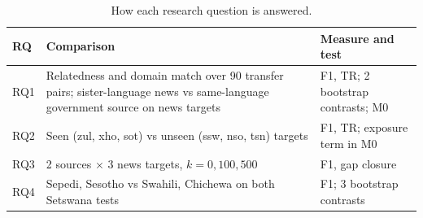 \begin{table}[t]
\centering\footnotesize
\caption{How each research question is answered.}
\label{tab:rqmap}
\begin{tabular}{@{}l>{\raggedright}p{3.7cm}>{\raggedright\arraybackslash}p{2.6cm}@{}}
\toprule
RQ & Comparison & Measure and test\\
\midrule
RQ1 & Relatedness and domain match over 90 transfer pairs; sister-language news vs same-language government source on news targets & F1, TR; 2 bootstrap contrasts; M0\\
RQ2 & Seen (zul, xho, sot) vs unseen (ssw, nso, tsn) targets & F1, TR; exposure term in M0\\
RQ3 & 2 sources $\times$ 3 news targets, $k=0,100,500$ & F1, gap closure\\
RQ4 & Sepedi, Sesotho vs Swahili, Chichewa on both Setswana tests & F1; 3 bootstrap contrasts\\
\bottomrule
\end{tabular}
\end{table}
